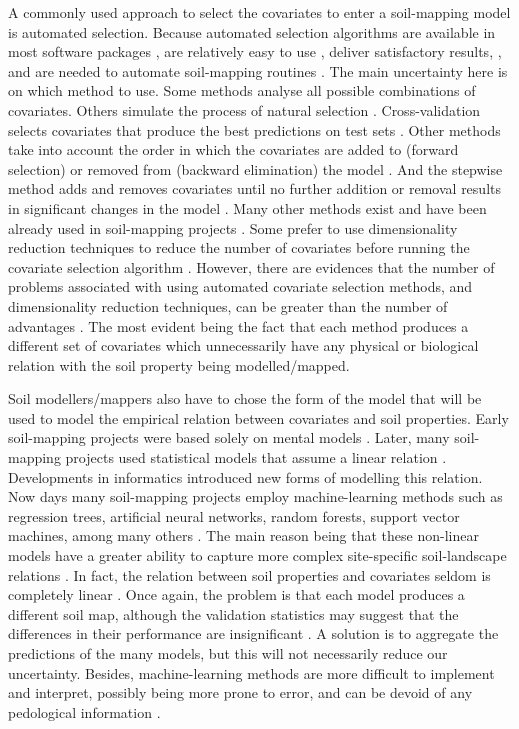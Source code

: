 A commonly used approach to select the covariates to enter a soil-mapping model is automated selection.
Because automated selection algorithms are available in most software packages \cite{Harrell2001a}, 
are relatively easy to use \cite{DraperEtAl1971}, deliver satisfactory results, 
\cite{HenglEtAl2004}, and are needed to automate soil-mapping routines \cite{HenglEtAl2014}. The 
main uncertainty here is on which method to use. Some methods analyse all possible combinations of 
covariates. Others simulate the process of natural selection \cite{AndersenEtAl2010}. 
Cross-validation selects covariates that produce the best predictions on test sets 
\cite{GuyonEtAl2003}. Other methods take into account the order in which the covariates are added 
to (forward selection) or removed from (backward elimination) the model \cite{LarkEtAl2007a}. And 
the stepwise method adds and removes covariates until no further addition or removal results in 
significant changes in the model \cite{DraperEtAl1998}. Many other methods exist and have been 
already used in soil-mapping projects \cite{PoggioEtAl2013,NussbaumEtAl2014}. Some prefer to use 
dimensionality reduction techniques to reduce the number of covariates \cite{Massy1965} before 
running the covariate selection algorithm \cite{tenCatenEtAl2011a,HenglEtAl2014}. However, there 
are evidences that the number of problems associated with using automated covariate selection 
methods, and dimensionality reduction techniques, can be greater than the number of advantages 
\cite{FarrarEtAl1967,Jackson1993,Chatfield1995,Edirisooriya1995,Harrell2001a,Jolliffe2002,Peres-NetoEtAl2005,LarkEtAl2007a}. 
The most evident being the fact that each method produces a 
different set of covariates which unnecessarily have any physical or biological relation with the 
soil property being modelled/mapped.
 
Soil modellers/mappers also have to chose the form of the model that will be used to model the 
empirical relation between covariates and soil properties. Early soil-mapping projects were based 
solely on mental models \cite{Hudson1992}. Later, many soil-mapping projects used statistical 
models that assume a linear relation \cite{MooreEtAl1993,OdehEtAl1994}. Developments in 
informatics introduced new forms of modelling this relation. Now days many soil-mapping projects 
employ machine-learning methods such as regression trees, artificial neural networks, random forests, 
support vector machines, among many others \cite{HeungEtAl2016}. The main reason being that these
non-linear models have a greater ability to capture more complex site-specific soil-landscape relations
\cite{Grunwald2009}. In fact, the relation between soil properties and covariates seldom is 
completely linear \cite{McKenzieEtAl1999}. Once again, the problem is that each model produces a 
different soil map, although the validation statistics may suggest that the differences in their 
performance are insignificant \cite{HeungEtAl2016}. A solution is to aggregate the predictions of 
the many models, but this will not necessarily reduce our uncertainty. Besides, machine-learning 
methods are more difficult to implement and interpret, possibly being more prone to error, and can 
be devoid of any pedological information \cite{Grunwald2009}.

